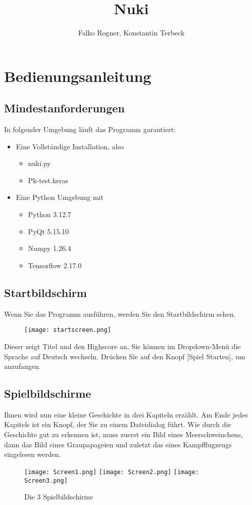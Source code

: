 \documentclass{article}
\title{Nuki}
\author{Falko Rogner, Konstantin Terbeck}
\begin{document}
\maketitle
\section{Bedienungsanleitung}

\subsection{Mindestanforderungen}

In folgender Umgebung läuft das Programm garantiert:
\begin{itemize}
  \item Eine Vollständige Installation, also
  \begin{itemize}
      \item nuki.py
      \item Pk-test.keras
  \end{itemize}
  \item Eine Python Umgebung mit 
  \begin{itemize}
      \item Python 3.12.7
      \item PyQt 5.15.10
      \item Numpy 1.26.4
      \item Tensorflow 2.17.0
  \end{itemize}
\end{itemize}

\subsection{Startbildschirm}
Wenn Sie das Programm ausführen, werden Sie den Startbildschirm sehen.
\begin{figure}[h]
\centering
\texttt{[image: startscreen.png]}
\end{figure}
Dieser zeigt Titel und den Highscore an. Sie können im Dropdown-Menü die Sprache auf Deutsch wechseln. Drücken Sie auf den Knopf [Spiel Starten], um anzufangen.

\subsection{Spielbildschirme}
Ihnen wird nun eine kleine Geschichte in drei Kapiteln erzählt. Am Ende jedes Kapitels ist ein Knopf, der Sie zu einem Dateidialog führt. Wie durch die Geschichte gut zu erkennen ist, muss zuerst ein Bild eines Meerschweinchens, dann das Bild eines Graupapageien und zuletzt das eines Kampfflugzeugs eingelesen werden.
\begin{figure}[h]
\centering
\texttt{[image: Screen1.png]}
\texttt{[image: Screen2.png]}
\texttt{[image: Screen3.png]}
\caption{Die 3 Spielbildschirme}
\end{figure}
\end{document}

